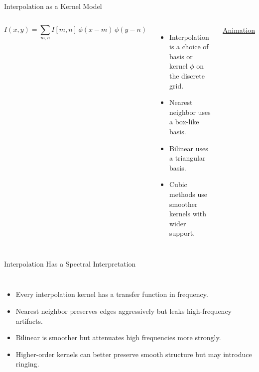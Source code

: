 \documentclass[aspectratio=169,10pt]{beamer}
\begin{document}
\begin{frame}{Interpolation as a Kernel Model}
\begin{columns}[T,onlytextwidth]
\[
I(x,y) = \sum_{m,n} I[m,n] \, \phi(x-m)\,\phi(y-n)
\]
\vspace{-0.6em}
\begin{itemize}
\item Interpolation is a choice of basis or kernel $\phi$ on the discrete grid.
\item Nearest neighbor uses a box-like basis.
\item Bilinear uses a triangular basis.
\item Cubic methods use smoother kernels with wider support.
\end{itemize}



\centering
{}

\href{https://www.youtube.com/watch?v=Xj129kA3Ci0}{\color{blue}Animation}

\end{columns}

\end{frame}

\begin{frame}{Interpolation Has a Spectral Interpretation}
\begin{columns}[T,onlytextwidth]
\begin{itemize}
\item Every interpolation kernel has a transfer function in frequency.
\item Nearest neighbor preserves edges aggressively but leaks high-frequency artifacts.
\item Bilinear is smoother but attenuates high frequencies more strongly.
\item Higher-order kernels can better preserve smooth structure but may introduce ringing.
\end{itemize}


\centering
{}
\end{columns}
\end{frame}
\end{document}
